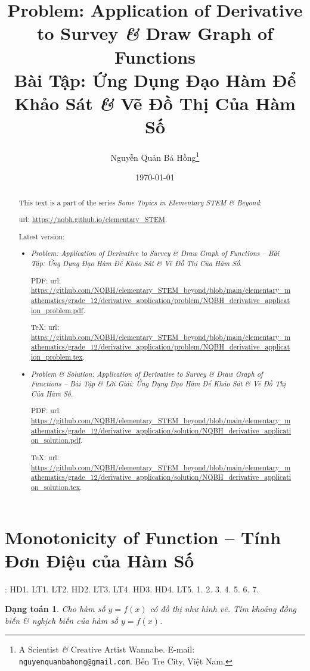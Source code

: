 \documentclass{article}
\title{Problem: Application of Derivative to Survey {\it\&} Draw Graph of Functions\\Bài Tập: Ứng Dụng Đạo Hàm Để Khảo Sát {\it\&} Vẽ Đồ Thị Của Hàm Số}
\author{Nguyễn Quản Bá Hồng\footnote{A Scientist {\it\&} Creative Artist Wannabe. E-mail: {\tt nguyenquanbahong@gmail.com}. Bến Tre City, Việt Nam.}}
\date{\today}
\newtheorem{dangtoan}{Dạng toán}
\begin{document}
\maketitle
\begin{abstract}
	This text is a part of the series {\it Some Topics in Elementary STEM \& Beyond}:
	
	{\sc url}: \url{https://nqbh.github.io/elementary_STEM}.
	
	Latest version:
	\begin{itemize}
		\item {\it Problem: Application of Derivative to Survey \& Draw Graph of Functions -- Bài Tập: Ứng Dụng Đạo Hàm Để Khảo Sát \& Vẽ Đồ Thị Của Hàm Số}.
		
		PDF: {\sc url}: \url{https://github.com/NQBH/elementary_STEM_beyond/blob/main/elementary_mathematics/grade_12/derivative_application/problem/NQBH_derivative_application_problem.pdf}.
		
		\TeX: {\sc url}: \url{https://github.com/NQBH/elementary_STEM_beyond/blob/main/elementary_mathematics/grade_12/derivative_application/problem/NQBH_derivative_application_problem.tex}.
		\item {\it Problem \& Solution: Application of Derivative to Survey \& Draw Graph of Functions -- Bài Tập \& Lời Giải: Ứng Dụng Đạo Hàm Để Khảo Sát \& Vẽ Đồ Thị Của Hàm Số}.
		
		PDF: {\sc url}: \url{https://github.com/NQBH/elementary_STEM_beyond/blob/main/elementary_mathematics/grade_12/derivative_application/solution/NQBH_derivative_application_solution.pdf}.
		
		\TeX: {\sc url}: \url{https://github.com/NQBH/elementary_STEM_beyond/blob/main/elementary_mathematics/grade_12/derivative_application/solution/NQBH_derivative_application_solution.tex}.
	\end{itemize}
\end{abstract}
\tableofcontents


\section{Monotonicity of Function -- Tính Đơn Điệu của Hàm Số}
\cite[Chap. I, \S1, pp. 5--14]{SGK_Toan_12_Canh_Dieu_tap_1}: HD1. LT1. LT2. HD2. LT3. LT4. HD3. HD4. LT5. 1. 2. 3. 4. 5. 6. 7.

\begin{dangtoan}
	Cho hàm số $y = f(x)$ có đồ thị như hình vẽ. Tìm khoảng đồng biến \& nghịch biến của hàm số $y = f(x)$.
\end{dangtoan}
\end{document}

